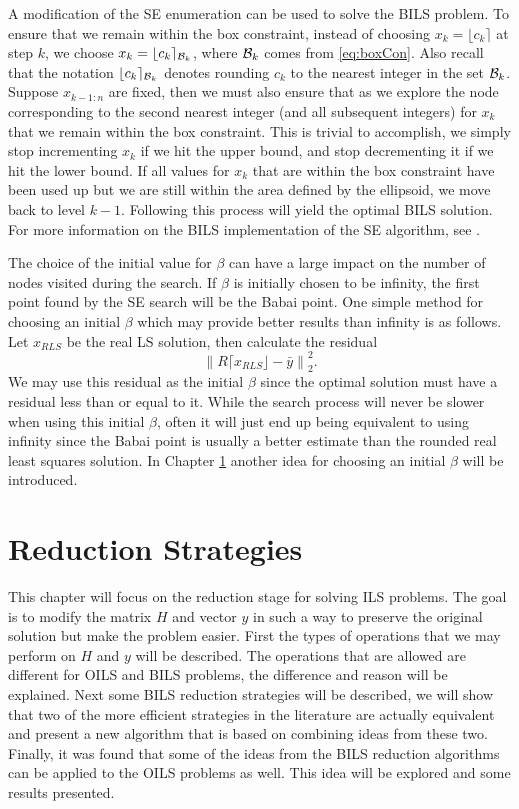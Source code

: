 \documentclass[12pt,Bold,letterpaper]{mcgilletdclass}
\begin{document}
A modification of the SE enumeration can be used to solve the BILS problem. To ensure that we remain within the box constraint, instead of choosing $x_k = \lfloor c_k \rceil$ at step $k$, we choose $x_{k} = \lfloor c_{k} \rceil_{{\cal B}_{k}}$, where ${\cal B}_{k}$ comes from \eqref{eq:boxCon}. Also recall that the notation $\lfloor c_{k} \rceil_{{\cal B}_{k}}$ denotes rounding $c_k$ to the nearest integer in the set ${\cal B}_{k}$. Suppose $x_{k-1:n}$ are fixed, then we must also ensure that as we explore the node corresponding to the second nearest integer (and all subsequent integers) for $x_k$ that we remain within the box constraint. This is trivial to accomplish, we simply stop incrementing $x_k$ if we hit the upper bound, and stop decrementing it if we hit the lower bound. If all values for $x_k$ that are within the box constraint have been used up but we are still within the area defined by the ellipsoid, we move back to level $k-1$. Following this process will yield the optimal BILS solution. For more information on the BILS implementation of the SE algorithm, see \cite{ChaH05}.

The choice of the initial value for $\beta$ can have a large impact on the number of nodes visited during the search. If $\beta$ is initially chosen to be infinity, the first point found by the SE search will be the Babai point. One simple method for choosing an initial $\beta$ which may provide better results than infinity is as follows. Let $x_{\scriptscriptstyle{RLS}}$ be the real LS solution, then calculate the residual $$\left \| R \lceil x_{\scriptscriptstyle{RLS}} \rfloor - \bar{y} \right \|_2^2.$$ We may use this residual as the initial $\beta$ since the optimal solution must have a residual less than or equal to it. While the search process will never be slower when using this initial $\beta$, often it will just end up being equivalent to using infinity since the Babai point is usually a better estimate than the rounded real least squares solution. In Chapter \ref{chap:Reduction} another idea for choosing an initial $\beta$ will be introduced.

\chapter{Reduction Strategies} \label{chap:Reduction}

This chapter will focus on the reduction stage for solving ILS problems. The goal is to modify the matrix $H$ and vector $y$ in such a way to preserve the original solution but make the problem easier. First the types of operations that we may perform on $H$ and $y$ will be described. The operations that are allowed are different for OILS and BILS problems, the difference and reason will be explained. Next some BILS reduction strategies will be described, we will show that two of the more efficient strategies in the literature are actually equivalent and present a new algorithm that is based on combining ideas from these two. Finally, it was found that some of the ideas from the BILS reduction algorithms can be applied to the OILS problems as well. This idea will be explored and some results presented.
\end{document}
